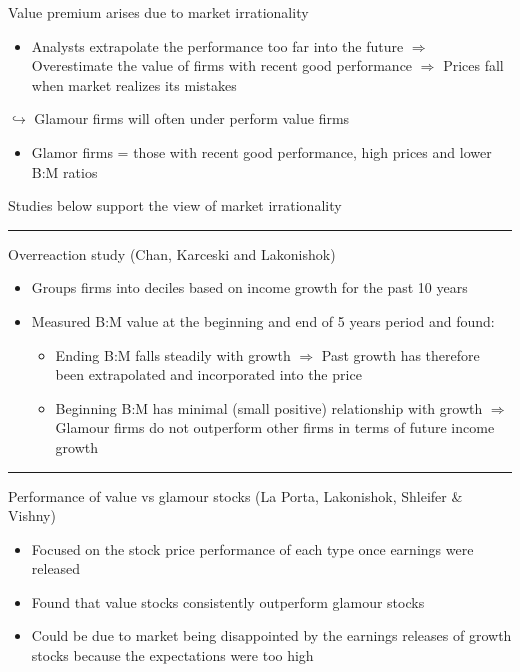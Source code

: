 \documentclass[]{book}
\providecommand{\tightlist}{%
  \setlength{\itemsep}{0pt}\setlength{\parskip}{0pt}}
\theoremstyle{definition}
\theoremstyle{definition}
\theoremstyle{remark}
\begin{document}
Value premium arises due to market irrationality

\begin{itemize}
\tightlist
\item
  Analysts extrapolate the performance too far into the future
  \(\Rightarrow\) Overestimate the value of firms with recent good
  performance \(\Rightarrow\) Prices fall when market realizes its
  mistakes
\end{itemize}

\(\hookrightarrow\) Glamour firms will often under perform value firms

\begin{itemize}
\tightlist
\item
  Glamor firms = those with recent good performance, high prices and
  lower B:M ratios
\end{itemize}

Studies below support the view of market irrationality

\begin{center}\rule{0.5\linewidth}{\linethickness}\end{center}

Overreaction study (Chan, Karceski and Lakonishok)

\begin{itemize}
\item
  Groups firms into deciles based on income growth for the past 10 years
\item
  Measured B:M value at the beginning and end of 5 years period and
  found:

  \begin{itemize}
  \item
    Ending B:M falls steadily with growth \(\Rightarrow\) Past growth
    has therefore been extrapolated and incorporated into the price
  \item
    Beginning B:M has minimal (small positive) relationship with growth
    \(\Rightarrow\) Glamour firms do not outperform other firms in terms
    of future income growth
  \end{itemize}
\end{itemize}

\begin{center}\rule{0.5\linewidth}{\linethickness}\end{center}

Performance of value vs glamour stocks (La Porta, Lakonishok, Shleifer
\& Vishny)

\begin{itemize}
\item
  Focused on the stock price performance of each type once earnings were
  released
\item
  Found that value stocks consistently outperform glamour stocks
\item
  Could be due to market being disappointed by the earnings releases of
  growth stocks because the expectations were too high
\end{itemize}
\end{document}
